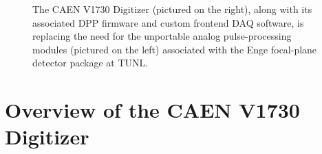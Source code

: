 \begin{figure}[t]
\caption{The CAEN V1730 Digitizer (pictured on the right), along with its associated DPP firmware and custom frontend DAQ software, is replacing the need for the unportable analog pulse-processing modules (pictured on the left) associated with the Enge focal-plane detector package at TUNL.}
\label{upgrade}
\end{figure}


\clearpage %
\section{Overview of the CAEN V1730 Digitizer} \label{digitizer} 

